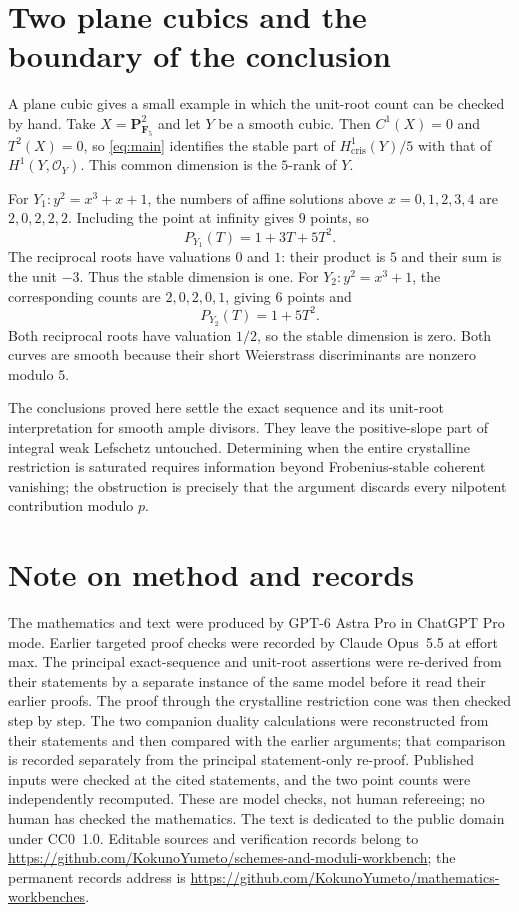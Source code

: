 \documentclass[11pt]{article}
\theoremstyle{remark}\newtheorem{remark}[theorem]{Remark}
\newcommand{\OO}{\mathcal O}
\newcommand{\cris}{\mathrm{cris}}
\newcommand{\workbenchurl}{https://github.com/KokunoYumeto/schemes-and-moduli-workbench}
\newcommand{\recordurl}{https://github.com/KokunoYumeto/mathematics-workbenches}
\begin{document}
\section{Two plane cubics and the boundary of the conclusion}

A plane cubic gives a small example in which the unit-root count can be checked by hand. Take $X=\mathbf P^2_{\mathbf F_5}$ and let $Y$ be a smooth cubic. Then $C^1(X)=0$ and $T^2(X)=0$, so \eqref{eq:main} identifies the stable part of $H^1_{\cris}(Y)/5$ with that of $H^1(Y,\OO_Y)$. This common dimension is the $5$-rank of $Y$.

For $Y_1:y^2=x^3+x+1$, the numbers of affine solutions above $x=0,1,2,3,4$ are $2,0,2,2,2$. Including the point at infinity gives $9$ points, so
\[
 P_{Y_1}(T)=1+3T+5T^2.
\]
The reciprocal roots have valuations $0$ and $1$: their product is $5$ and their sum is the unit $-3$. Thus the stable dimension is one. For $Y_2:y^2=x^3+1$, the corresponding counts are $2,0,2,0,1$, giving $6$ points and
\[
 P_{Y_2}(T)=1+5T^2.
\]
Both reciprocal roots have valuation $1/2$, so the stable dimension is zero. Both curves are smooth because their short Weierstrass discriminants are nonzero modulo $5$.

The conclusions proved here settle the exact sequence and its unit-root interpretation for smooth ample divisors. They leave the positive-slope part of integral weak Lefschetz untouched. Determining when the entire crystalline restriction is saturated requires information beyond Frobenius-stable coherent vanishing; the obstruction is precisely that the argument discards every nilpotent contribution modulo $p$.

\section*{Note on method and records}

The mathematics and text were produced by GPT-6 Astra Pro in ChatGPT Pro mode. Earlier targeted proof checks were recorded by Claude Opus~5.5 at effort max. The principal exact-sequence and unit-root assertions were re-derived from their statements by a separate instance of the same model before it read their earlier proofs. The proof through the crystalline restriction cone was then checked step by step. The two companion duality calculations were reconstructed from their statements and then compared with the earlier arguments; that comparison is recorded separately from the principal statement-only re-proof. Published inputs were checked at the cited statements, and the two point counts were independently recomputed. These are model checks, not human refereeing; no human has checked the mathematics. The text is dedicated to the public domain under CC0~1.0. Editable sources and verification records belong to \url{\workbenchurl}; the permanent records address is \url{\recordurl}.
\end{document}
